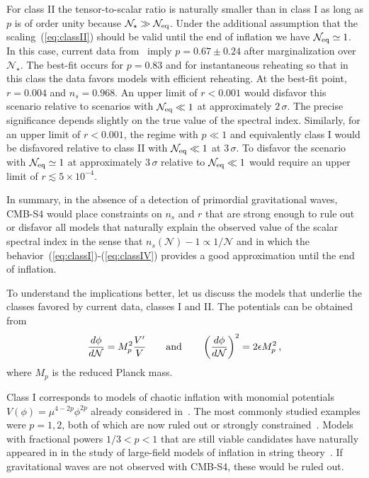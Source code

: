 For class II the tensor-to-scalar ratio is naturally smaller than in class I as long as $p$ is of order unity because $\mathcal{N}_\star\gg\mathcal{N}_{\rm eq}$. Under the additional assumption that the scaling~(\ref{eq:classII}) should be valid until the end of inflation we have $\mathcal{N}_{\rm eq}\simeq 1$. In this case, current data from~\cite{bicepkeckplanck15} imply $p=0.67\pm0.24$ after marginalization over $\mathcal{N}_\star$. The best-fit occurs for $p=0.83$ and for instantaneous reheating so that in this class the data favors models with efficient reheating. At the best-fit point, $r=0.004$ and $n_s=0.968$. An upper limit of $r<0.001$ would disfavor this scenario relative to scenarios with $\mathcal{N}_{\rm eq}\ll 1$ at approximately $2\,\sigma$. The precise significance depends slightly on the true value of the spectral index. Similarly, for an upper limit of $r<0.001$, the regime with $p\ll1$ and equivalently class I would be disfavored relative to class II with $\mathcal{N}_{\rm eq}\ll 1$ at $3\,\sigma$. To disfavor the scenario with $\mathcal{N}_{\rm eq}\simeq 1$ at approximately $3\,\sigma$ relative to $\mathcal{N}_{\rm eq}\ll 1$ would require an upper limit of $r\lesssim 5\times 10^{-4}$.  

In summary, in the absence of a detection of primordial gravitational waves, CMB-S4 would place constraints on $n_s$ and $r$ that are strong enough to rule out or disfavor all models that naturally explain the observed value of the scalar spectral index in the sense that $n_s(\mathcal{N})-1\propto 1/\mathcal{N}$ and in which the behavior~(\ref{eq:classI})-(\ref{eq:classIV}) provides a good approximation until the end of inflation. 

To understand the implications better, let us discuss the models that underlie the classes favored by current data, classes I and II. The  potentials can be obtained from 
\begin{equation}
\frac{d\phi}{d\mathcal{N}}=M_p^2\frac{V'}{V}\qquad{\rm and}\qquad \left(\frac{d\phi}{d\mathcal{N}}\right)^2=2\epsilon M_p^2\,,
\end{equation}
where $M_p$ is the reduced Planck mass.

Class I corresponds to models of chaotic inflation with monomial potentials $V(\phi)=\mu^{4-2p}\phi^{2p}$
already considered in~\cite{Linde:1983gd}. The most commonly studied examples were $p=1,2$, both of which are now ruled out or strongly constrained~\cite{bicepkeckplanck15}. Models with fractional powers $1/3<p<1$ that are still viable candidates have naturally appeared in in the study of large-field models of inflation in string theory~\cite{Silverstein:2008sg,McAllister:2008hb,Flauger:2009ab}. If gravitational waves are not observed with CMB-S4, these would be ruled out.

